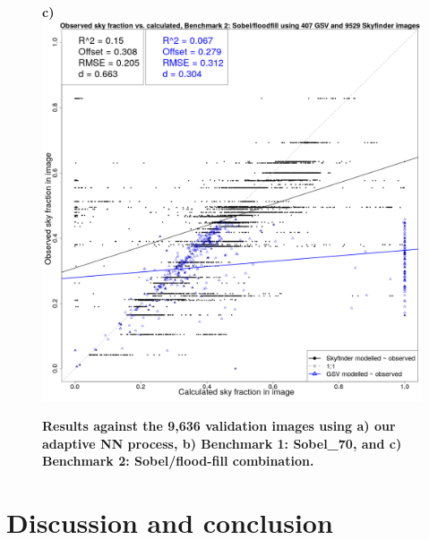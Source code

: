 \documentclass[final,3p,times,authoryear]{elsarticle}
\begin{document}
\begin{figure}
\textbf{c)}\includegraphics[scale=0.15]{Images/ErrorPlots2FloodfillValidation.png}
\caption{\textbf{
Results against the 9,636 validation images using a) our adaptive NN process, b) Benchmark 1: Sobel\_70, and c) Benchmark 2: Sobel/flood-fill combination.}}
\label{fig:errorfloodall}
\end{figure}


\section{Discussion and conclusion}\label{sec:conclusion}
\end{document}
